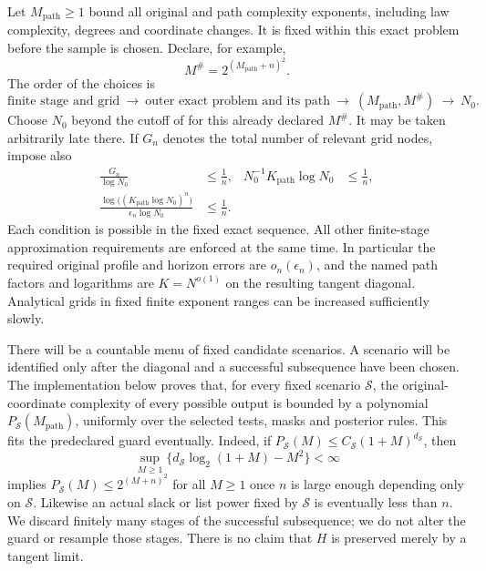 Let \(M_{\mathrm{path}}\ge1\) bound all original and path complexity
exponents, including law complexity, degrees and coordinate changes.
It is fixed within this exact problem before the sample is chosen.
Declare, for example,
\begin{equation}
M^\#=2^{(M_{\mathrm{path}}+n)^2}.
 \label{a03:complexity-guard}
\end{equation}
The order of the choices is
\begin{equation}
\text{finite stage and grid}
 \ \longrightarrow\
 \text{outer exact problem and its path}
 \ \longrightarrow\
 (M_{\mathrm{path}},M^\#)
 \ \longrightarrow\
 N_0 .
 \label{a03:limit-order}
\end{equation}
Choose \(N_0\) beyond the cutoff of  for this
already declared \(M^\#\).  It may be taken arbitrarily late there.
If \(G_n\) denotes the total number of relevant grid nodes, impose also
\begin{align}
 \frac{G_n}{\log N_0}&\le\frac1n,
 &
 N_0^{-1}K_{\mathrm{path}}\log N_0&\le\frac1n,
 \label{a03:mass-diagonal}\\
 \frac{\log\big((K_{\mathrm{path}}\log N_0)^n\big)}
      {\epsilon_n\log N_0}&\le\frac1n .
 \label{a03:slack-diagonal}
\end{align}
Each condition is possible in the fixed exact sequence.  All other
finite-stage approximation requirements are enforced at the same time.
In particular the required original profile and horizon errors are
\(o_n(\epsilon_n)\), and the named path factors and logarithms are
\(K=N^{o(1)}\) on the resulting tangent diagonal.  Analytical grids in
fixed finite exponent ranges can be increased sufficiently slowly.

There will be a countable menu of fixed candidate scenarios.  A
scenario will be identified only after the diagonal and a successful
subsequence have been chosen.  The implementation below proves that,
for every fixed scenario \(\mathcal S\), the original-coordinate
complexity of every possible output is bounded by a polynomial
\(P_{\mathcal S}(M_{\mathrm{path}})\), uniformly over the selected tests,
masks and posterior rules.  This fits the predeclared guard eventually.
Indeed, if \(P_{\mathcal S}(M)\le C_{\mathcal S}(1+M)^{d_{\mathcal S}}\),
then
\begin{equation}
\sup_{M\ge1}
 \{d_{\mathcal S}\log_2(1+M)-M^2\}<\infty
\end{equation}
implies \(P_{\mathcal S}(M)\le2^{(M+n)^2}\) for all \(M\ge1\) once
\(n\) is large enough depending only on \(\mathcal S\).  Likewise an
actual slack or list power fixed by \(\mathcal S\) is eventually less
than \(n\).  We discard finitely many stages of the successful
subsequence; we do not alter the guard or resample those stages.
There is no claim that \(H\) is preserved merely by a tangent limit.

